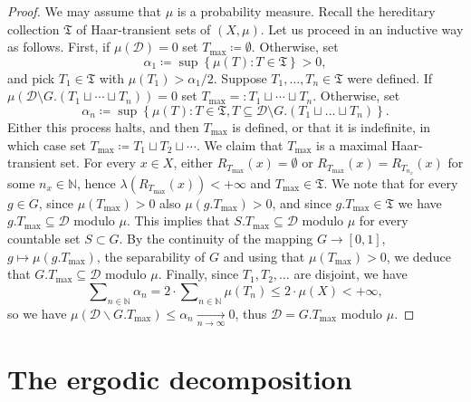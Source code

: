 \documentclass{amsart}
\numberwithin{equation}{subsection}
\begin{document}
\begin{proof}
We may assume that \(\mu\) is a probability measure. Recall the hereditary collection \(\mathfrak{T}\) of Haar-transient sets of \(\left(X,\mu\right)\). Let us proceed in an inductive way as follows. First, if \(\mu\left(\mathcal{D}\right)=0\) set \(T_{\max}\coloneqq \emptyset\). Otherwise, set
\[\alpha_{1}\coloneqq \sup\left\{ \mu\left(T\right):T\in\mathfrak{T}\right\}>0,\]
and pick \(T_{1}\in\mathfrak{T}\) with \(\mu\left(T_{1}\right)>\alpha_{1}/2\). Suppose \(T_{1},\dots,T_{n}\in\mathfrak{T}\) were defined. If \(\mu\left(\mathcal{D}\setminus G.\left(T_{1}\sqcup\dotsm\sqcup T_{n}\right)\right)=0\) set \(T_{\max}=:T_{1}\sqcup\dotsm\sqcup T_{n}\). Otherwise, set
\[\alpha_{n}\coloneqq \sup\left\{\mu(T):T\in\mathfrak{T},T\subseteq\mathcal{D}\setminus G.\left(T_{1}\sqcup...\sqcup T_{n}\right)\right\}.\]
Either this process halts, and then \(T_{\mathrm{max}}\) is defined, or that it is indefinite, in which case set \(T_{\max}\coloneqq T_{1}\sqcup T_{2}\sqcup\dotsm\). We claim that \(T_{\max}\) is a maximal Haar-transient set. For every \(x\in X\), either \(R_{T_{\max}}\left(x\right)=\emptyset\) or \(R_{T_{\max}}\left(x\right)=R_{T_{n_{x}}}\left(x\right)\) for some \(n_{x}\in\mathbb{N}\), hence \(\lambda\left(R_{T_{\max}}\left(x\right)\right)<+\infty\) and \(T_{\max}\in\mathfrak{T}\). We note that for every \(g\in G\), since \(\mu\left(T_{\max}\right)>0\) also \(\mu\left(g.T_{\max}\right)>0\), and since \(g.T_{\max}\in\mathfrak{T}\) we have \(g.T_{\max}\subseteq\mathcal{D}\) modulo \(\mu\). This implies that \(S.T_{\max}\subseteq\mathcal{D}\) modulo \(\mu\) for every countable set \(S\subset G\). By the continuity of the mapping \(G\to\left[0,1\right]\), \(g\mapsto\mu\left(g.T_{\mathrm{max}}\right)\), the separability of \(G\) and using that \(\mu\left(T_{\max}\right)>0\), we deduce that \(G.T_{\max}\subseteq\mathcal{D}\) modulo \(\mu\). Finally, since \(T_{1},T_{2},\dotsc\) are disjoint, we have
\[\sum\nolimits_{n\in\mathbb{N}}\alpha_{n}=2\cdot\sum\nolimits_{n\in\mathbb{N}}\mu\left(T_{n}\right)\leq2\cdot\mu\left(X\right)<+\infty,\]
so we have \(\mu\left(\mathcal{D}\backslash G.T_{\max}\right)\leq\alpha_{n}\xrightarrow[n\to\infty]{}0\), thus \(\mathcal{D}=G.T_{\max}\) modulo \(\mu\).
\end{proof}

\section{The ergodic decomposition}
\label{sct:ergdecomp}
\end{document}
